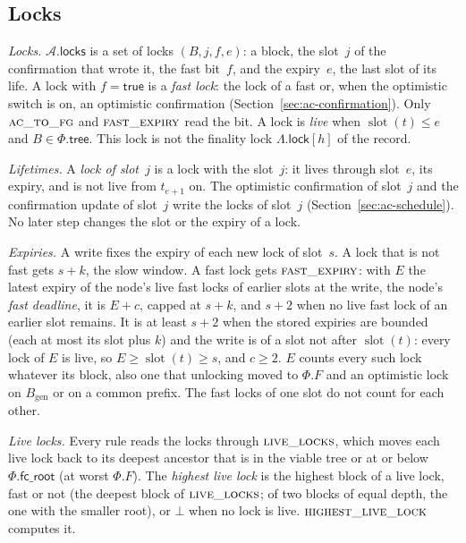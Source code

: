 \documentclass{article}
\newcommand{\genesis}{B_{\mathrm{gen}}}
\newcommand{\slot}{\operatorname{slot}}
\newcommand{\AC}{\mathcal A}
\newcommand{\Fr}{\Phi}
\newcommand{\tree}{\mathsf{tree}}
\newcommand{\fcroot}{\mathsf{fc\_root}}
\newcommand{\locks}{\mathsf{locks}}
\begin{document}
\subsection{Locks}\label{sec:ac-locks}

\emph{Locks.}  $\AC.\locks$ is a set of locks $(B,j,f,e)$: a block, the
slot~$j$ of the confirmation that wrote it, the fast bit~$f$, and the
expiry~$e$, the last slot of its life.  A lock with $f=\mathsf{true}$ is a
\emph{fast lock}: the lock of a fast or, when the optimistic switch is on,
an optimistic confirmation (Section~\ref{sec:ac-confirmation}).  Only $\Call{ac\_to\_fg}{}$ and
$\Call{fast\_expiry}{}$ read the bit.  A lock is \emph{live} when
$\slot(t)\leq e$ and $B\in\Fr.\tree$.  This lock
is not the finality lock $\Lambda.\mathsf{lock}[h]$ of the record.

\emph{Lifetimes.}  A \emph{lock of slot~$j$} is a lock with the slot~$j$:
it lives through slot~$e$, its expiry, and is not live from $t_{e+1}$ on.  The
optimistic confirmation of slot~$j$ and the confirmation update of
slot~$j$ write the locks of slot~$j$ (Section~\ref{sec:ac-schedule}).  No
later step changes the slot or the expiry of a lock.

\emph{Expiries.}  A write fixes the expiry of each new lock of slot~$s$.
A lock that is not fast gets $s+k$, the slow window.  A fast lock gets
$\Call{fast\_expiry}{}$: with $E$ the latest expiry of the node's live
fast locks of earlier slots at the write, the node's \emph{fast
deadline}, it is $E+c$, capped at $s+k$, and $s+2$ when no
live fast lock of an earlier slot remains.  It is at least $s+2$ when the
stored expiries are bounded (each at most its slot plus $k$) and the write is of a
slot not after $\slot(t)$: every lock of $E$ is live, so $E\geq\slot(t)\geq s$, and
$c\geq 2$.  $E$ counts every such lock whatever its
block, also one that unlocking moved to $\Fr.F$ and an optimistic lock on
$\genesis$ or on a common prefix.  The fast locks of one slot do not count
for each other.

\emph{Live locks.}  Every rule reads the locks through
$\Call{live\_locks}{}$, which moves each live lock back to its deepest
ancestor that is in the viable tree or at or below $\Fr.\fcroot$ (at worst
$\Fr.F$).  The \emph{highest live lock} is the highest block of a live lock,
fast or not (the deepest block of $\Call{live\_locks}{}$; of two blocks of equal
depth, the one with the smaller root), or $\bot$ when no lock is live.
$\Call{highest\_live\_lock}{}$ computes it.
\end{document}
